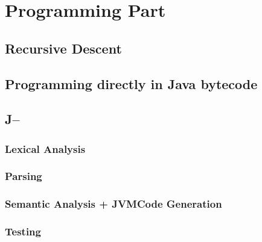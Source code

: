 \section{Programming Part}
\subsection{Recursive Descent}


\subsection{Programming directly in Java bytecode}


\subsection{J--}
\subsubsection{Lexical Analysis}

\subsubsection{Parsing}

\subsubsection{Semantic Analysis + JVM­Code Generation}

\subsubsection{Testing}


